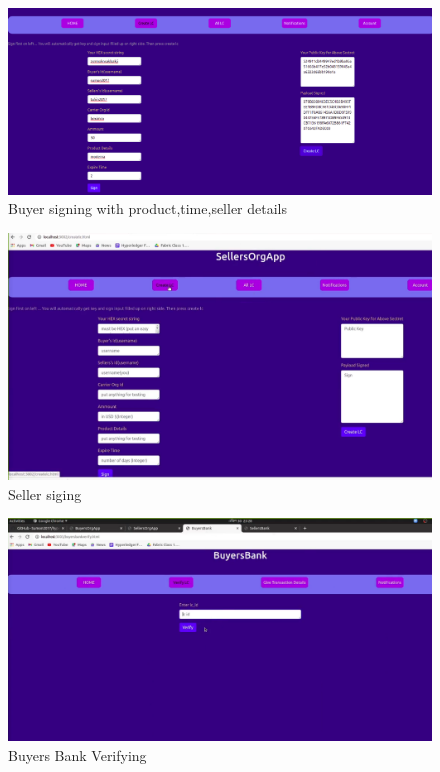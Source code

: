 \documentclass[a4paper,12pt]{report}
\begin{document}
\begin{figure}[b]
    \centering
    \includegraphics[width=0.7\paperwidth]{1 (1).pdf}
    \caption{Buyer signing with product,time,seller details}
    \label{fig:1}
\end{figure}


\newpage

\begin{figure}[h]
    \centering
    \includegraphics[width=0.7\paperwidth]{5.pdf}
    \caption{Seller siging}
    \label{fig:5}
\end{figure}

\begin{figure}[t]
    \includegraphics[width=0.7\paperwidth]{7.pdf}
    \caption{Buyers Bank Verifying}
    \label{fig:7}
\end{figure}
\end{document}
